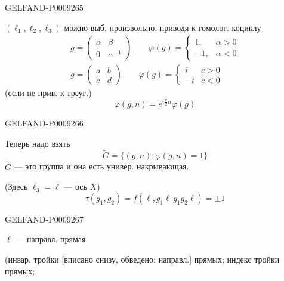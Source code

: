 \begin{GelfandAdjacentEvidence}{GELFAND-P000926}{5}


$(\ell_1,\ell_2,\ell_3)$ можно выб. произвольно, приводя к гомолог. коциклу
\begin{gather*}
 g=\begin{pmatrix}\alpha&\beta\\0&\alpha^{-1}\end{pmatrix}
 \qquad
 \varphi(g)=\begin{cases}1,&\alpha>0\\-1,&\alpha<0\end{cases}\\[4pt]
 g=\begin{pmatrix}a&b\\c&d\end{pmatrix}
 \qquad
 \varphi(g)=\begin{cases}i&c>0\\-i&c<0\end{cases}
\end{gather*}
(если не прив. к треуг.)
\[
 \varphi(g,n)=e^{i\frac{\pi}{2}n}\varphi(g)
\]
\end{GelfandAdjacentEvidence}
\begin{GelfandAdjacentEvidence}{GELFAND-P000926}{6}


Теперь надо взять
\[
 \widetilde G=\{(g,n):\varphi(g,n)=1\}
\]
$\widetilde G$ --- это группа и она есть универ. накрывающая.

\medskip
[справа]
(Здесь $\ell_3=\ell$ --- ось $X$)
\[
 \tau(g_1,g_2)=f(\ell,g_1\ell\,g_1g_2\ell)=\pm1
\]
\end{GelfandAdjacentEvidence}
\begin{GelfandAdjacentEvidence}{GELFAND-P000926}{7}


$\ell$ --- направл. прямая

(инвар. тройки [вписано снизу, обведено: направл.] прямых; индекс тройки прямых;
\end{GelfandAdjacentEvidence}
